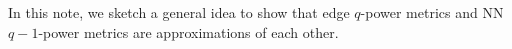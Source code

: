 In this note, we sketch a general idea to show that edge
$q$-power metrics and
NN $q-1$-power metrics are approximations of each other.
